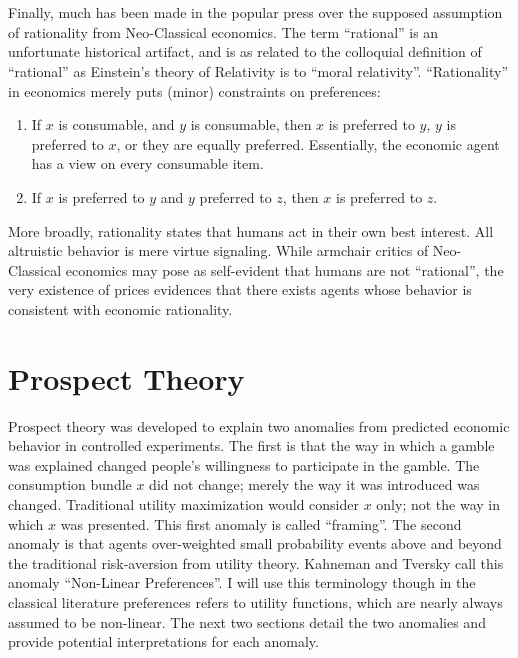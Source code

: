 \documentclass{article}
\begin{document}
\\
\\
Finally, much has been made in the popular press over the supposed assumption of rationality from Neo-Classical economics.  The term ``rational'' is an unfortunate historical artifact, and is as related to the colloquial definition of ``rational'' as Einstein's theory of Relativity is to ``moral relativity''.  ``Rationality'' in economics merely puts (minor) constraints on preferences: 
\begin{enumerate}
	\item If \(x\) is consumable, and \(y\) is consumable, then \(x\) is preferred to \(y\), \(y\) is preferred to \(x\), or they are equally preferred.  Essentially, the economic agent has a view on every consumable item.  
	\item If \(x\) is preferred to \(y\) and \(y\) preferred to \(z\), then \(x\) is preferred to \(z\).  
\end{enumerate}
More broadly, rationality states that humans act in their own best interest.  All altruistic behavior is mere virtue signaling. While armchair critics of Neo-Classical economics may pose as self-evident that humans are not ``rational'', the very existence of prices evidences that there exists agents whose behavior is consistent with economic rationality.   


\section{Prospect Theory}

Prospect theory was developed to explain two anomalies from predicted economic behavior in controlled experiments.  The first is that the way in which a gamble was explained changed people's willingness to participate in the gamble.  The consumption bundle \(x\) did not change; merely the way it was introduced was changed.  Traditional utility maximization would consider \(x\) only; not the way in which \(x\) was presented.  This first anomaly is called ``framing''.  The second anomaly is that agents over-weighted small probability events above and beyond the traditional risk-aversion from utility theory.  Kahneman and Tversky call this anomaly ``Non-Linear Preferences''.  I will use this terminology though in the classical literature preferences refers to utility functions, which are nearly always assumed to be non-linear. The next two sections detail the two anomalies and provide potential interpretations for each anomaly.  
\end{document}
